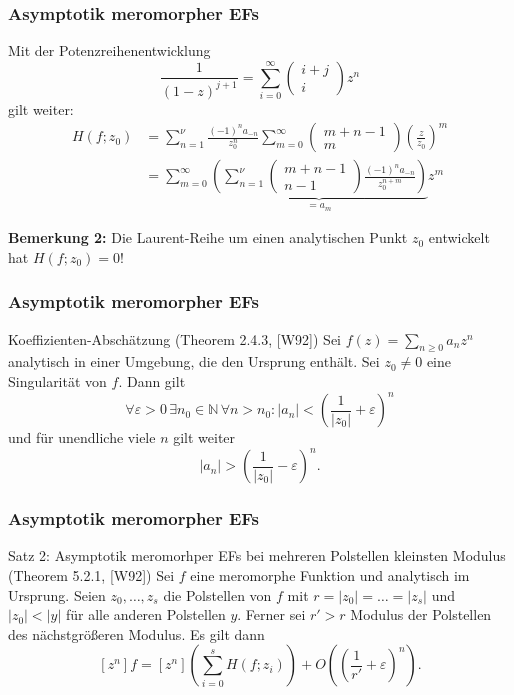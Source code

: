 \documentclass{beamer}
\begin{document}
\begin{frame}\frametitle{Asymptotik meromorpher EFs}
  Mit der Potenzreihenentwicklung
  \[
  	\frac{1}{(1 - z)^{j + 1}} = \sum\limits_{i = 0}^\infty \begin{pmatrix} i + j \\ i \end{pmatrix} z^n
  \]
  gilt weiter:
  \begin{align*}
    H(f; z_0) &= \sum\limits_{n = 1}^\nu \frac{(-1)^n a_{-n}}{z_0^n} \sum\limits_{m = 0}^\infty \begin{pmatrix} m + n - 1 \\ m \end{pmatrix} \left( \frac{z}{z_0} \right)^m \\
              &= \sum\limits_{m = 0}^\infty \underbrace{\left( \sum\limits_{n = 1}^\nu \begin{pmatrix} m + n - 1 \\ n - 1 \end{pmatrix} \frac{(-1)^n a_{-n}}{z_0^{n + m}} \right)}_{= a_m} z^m
  \end{align*}
  
  \textbf{Bemerkung 2:} Die Laurent-Reihe um einen analytischen Punkt $z_0$ entwickelt hat $H(f; z_0) = 0$!
\end{frame}

\begin{frame}\frametitle{Asymptotik meromorpher EFs}
  \begin{block}{Koeffizienten-Abschätzung (Theorem 2.4.3, [W92])}
    Sei $f(z) = \sum_{n \geq 0} a_n z^n$ analytisch in einer Umgebung, die den Ursprung enthält. Sei $z_0 \neq 0$ eine Singularität von $f$. Dann gilt
    \[
      \forall \varepsilon > 0 \, \exists n_0 \in \mathbb{N} \, \forall n > n_0: |a_n| < \left( \frac{1}{|z_0|} + \varepsilon \right)^n
    \]
    und für unendliche viele $n$ gilt weiter
    \[
      |a_n| > \left( \frac{1}{|z_0|} - \varepsilon \right)^n \text{.}
    \]
  \end{block}
\end{frame}

\begin{frame}\frametitle{Asymptotik meromorpher EFs}
  \begin{block}{Satz 2: Asymptotik meromorhper EFs bei mehreren Polstellen kleinsten Modulus (Theorem 5.2.1, [W92])}
    Sei $f$ eine meromorphe Funktion und analytisch im Ursprung. Seien $z_0, \dots, z_s$ die Polstellen von $f$ mit $r = |z_0| = \dots = |z_s|$ und $|z_0| < |y|$ für alle anderen Polstellen $y$. Ferner sei $r' > r$ Modulus der Polstellen des nächstgrößeren Modulus. Es gilt dann
    \[
      [z^n] f = [z^n] \left( \sum\limits_{i = 0}^s H(f; z_i) \right) + O\left( \left( \frac{1}{r'} + \varepsilon \right)^n \right) \text{.}
    \]
  \end{block}
\end{frame}
\end{document}
